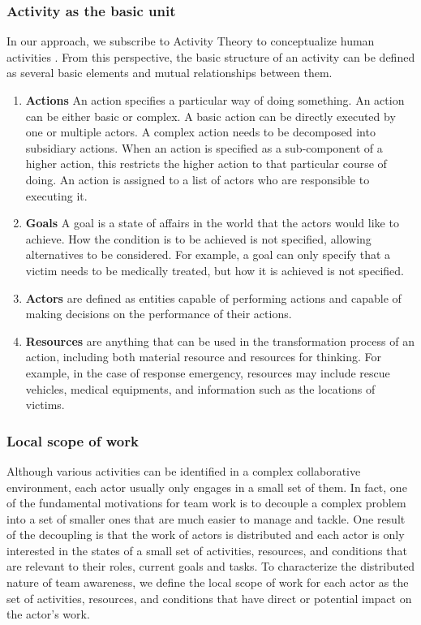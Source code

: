 \subsubsection{Activity as the basic unit} %
\label{ssub:activity_basic_unit}
In our approach, we subscribe to Activity Theory to conceptualize human activities \cite{nardi1996context}. From this perspective, the basic structure of an activity can be defined as several basic elements and mutual relationships between them.

\begin{enumerate}
	\item \textbf{Actions} An action specifies a particular way of doing something. An action can be either basic or complex. A basic action can be directly executed by one or multiple actors. A complex action needs to be decomposed into subsidiary actions. When an action is specified as a sub-component of a higher action, this restricts the higher action to that particular course of doing. An action is assigned to a list of actors who are responsible to executing it.
    \item \textbf{Goals} A goal is a state of affairs in the world that the actors would like to achieve. How the condition is to be achieved is not specified, allowing alternatives to be considered. For example, a goal can only specify that a victim needs to be medically treated, but how it is achieved is not specified.
    \item \textbf{Actors} are defined as entities capable of performing actions and capable of making decisions on the performance of their actions. 
    \item \textbf{Resources} are anything that can be used in the transformation process of an action, including both material resource and resources for thinking. For example, in the case of response emergency, resources may include rescue vehicles, medical equipments, and information such as the locations of victims. 
\end{enumerate}

\subsubsection{Local scope of work} %
\label{ssub:local_scope_of_work}
Although various activities can be identified in a complex collaborative environment, each actor usually only engages in a small set of them. In fact, one of the fundamental motivations for team work is to decouple a complex problem into a set of smaller ones that are much easier to manage and tackle. One result of the decoupling is that the work of actors is distributed and each actor is only interested in the states of a small set of activities, resources, and conditions that are relevant to their roles, current goals and tasks. To characterize the distributed nature of team awareness, we define the local scope of work for each actor as the set of activities, resources, and conditions that have direct or potential impact on the actor’s work.

